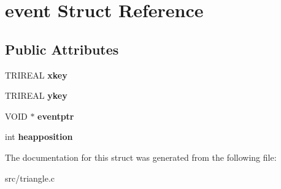 \hypertarget{structevent}{
\section{event Struct Reference}
\label{structevent}
}
\subsection*{Public Attributes}
\begin{DoxyCompactItemize}
\item 
\hypertarget{structevent_ae976e470131f6f58fca02dd6159f341a}{
TRIREAL {\bfseries xkey}}
\label{structevent_ae976e470131f6f58fca02dd6159f341a}

\item 
\hypertarget{structevent_ae6ca98fcd6f2332cb4ee63c8f0899fb8}{
TRIREAL {\bfseries ykey}}
\label{structevent_ae6ca98fcd6f2332cb4ee63c8f0899fb8}

\item 
\hypertarget{structevent_ae5fd20373d30ff0819348af30beb33f3}{
VOID $\ast$ {\bfseries eventptr}}
\label{structevent_ae5fd20373d30ff0819348af30beb33f3}

\item 
\hypertarget{structevent_a9ff72d28ddb7ea57df47fe9f0a7e9004}{
int {\bfseries heapposition}}
\label{structevent_a9ff72d28ddb7ea57df47fe9f0a7e9004}

\end{DoxyCompactItemize}


The documentation for this struct was generated from the following file:\begin{DoxyCompactItemize}
\item 
src/triangle.c\end{DoxyCompactItemize}
